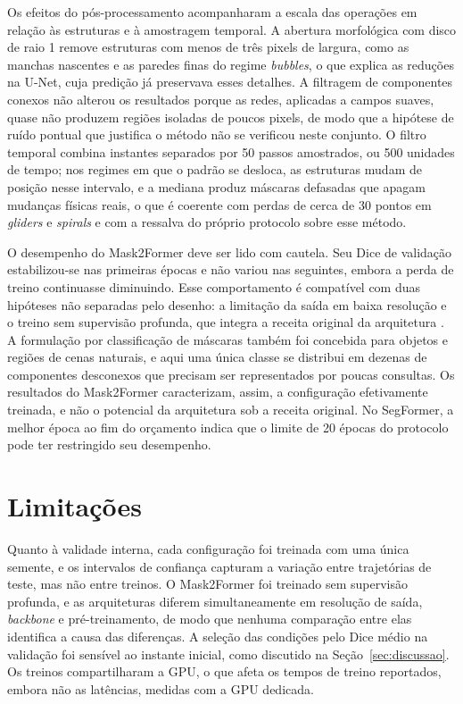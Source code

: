 \documentclass[12pt]{article}
\begin{document}
Os efeitos do pós-processamento acompanharam a escala das operações em relação às estruturas e à amostragem temporal. A abertura morfológica com disco de raio 1 remove estruturas com menos de três pixels de largura, como as manchas nascentes e as paredes finas do regime \textit{bubbles}, o que explica as reduções na U-Net, cuja predição já preservava esses detalhes. A filtragem de componentes conexos não alterou os resultados porque as redes, aplicadas a campos suaves, quase não produzem regiões isoladas de poucos pixels, de modo que a hipótese de ruído pontual que justifica o método não se verificou neste conjunto. O filtro temporal combina instantes separados por 50 passos amostrados, ou 500 unidades de tempo; nos regimes em que o padrão se desloca, as estruturas mudam de posição nesse intervalo, e a mediana produz máscaras defasadas que apagam mudanças físicas reais, o que é coerente com perdas de cerca de 30 pontos em \textit{gliders} e \textit{spirals} e com a ressalva do próprio protocolo sobre esse método.

O desempenho do Mask2Former deve ser lido com cautela. Seu Dice de validação estabilizou-se nas primeiras épocas e não variou nas seguintes, embora a perda de treino continuasse diminuindo. Esse comportamento é compatível com duas hipóteses não separadas pelo desenho: a limitação da saída em baixa resolução e o treino sem supervisão profunda, que integra a receita original da arquitetura \cite{cheng2022mask2former}. A formulação por classificação de máscaras também foi concebida para objetos e regiões de cenas naturais, e aqui uma única classe se distribui em dezenas de componentes desconexos que precisam ser representados por poucas consultas. Os resultados do Mask2Former caracterizam, assim, a configuração efetivamente treinada, e não o potencial da arquitetura sob a receita original. No SegFormer, a melhor época ao fim do orçamento indica que o limite de 20 épocas do protocolo pode ter restringido seu desempenho.

\section{Limitações}
\label{sec:limitacoes}

Quanto à validade interna, cada configuração foi treinada com uma única semente, e os intervalos de confiança capturam a variação entre trajetórias de teste, mas não entre treinos. O Mask2Former foi treinado sem supervisão profunda, e as arquiteturas diferem simultaneamente em resolução de saída, \textit{backbone} e pré-treinamento, de modo que nenhuma comparação entre elas identifica a causa das diferenças. A seleção das condições pelo Dice médio na validação foi sensível ao instante inicial, como discutido na Seção~\ref{sec:discussao}. Os treinos compartilharam a GPU, o que afeta os tempos de treino reportados, embora não as latências, medidas com a GPU dedicada.
\end{document}
